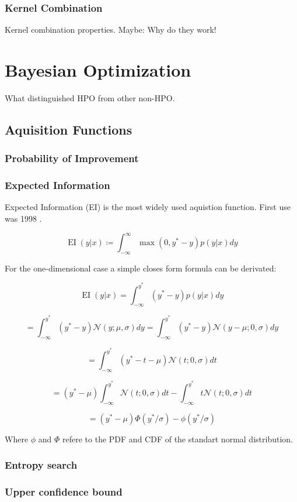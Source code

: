 \documentclass[english]{article}
\newcommand{\EI}{\operatorname{EI}}
\newcommand{\normal}{\mathcal{N}}
\begin{document}
\subsubsection{Kernel Combination}
Kernel combination properties. Maybe: Why do they work!

\section{Bayesian Optimization}
What distinguished \ac{HPO} from other non-\ac{HPO}.

\subsection{Aquisition Functions}

\subsubsection{Probability of Improvement}
\subsubsection{Expected Information}

Expected Information (EI) is the most widely used aquistion function. First use was 1998 \cite{jones_efficient_1998}.

$$ \EI(y|x) \coloneqq \int_{-\infty}^{\infty} \max(0, y^*-y)p(y|x)dy $$

For the one-dimensional case a simple closes form formula can be derivated:

$$ \EI(y|x) = \int_{-\infty}^{y^*}(y^*-y)p(y|x)dy$$

$$ = \int_{-\infty}^{y^*}(y^*-y)\normal(y; \mu, \sigma)dy =
\int_{-\infty}^{y^*}(y^*-y)\normal(y-\mu; 0, \sigma)dy$$

$$ = \int_{-\infty}^{y^*}(y^*- t - \mu)\normal(t; 0, \sigma)dt $$

$$ = (y^*-\mu)\int_{-\infty}^{y^*}\normal(t; 0, \sigma)dt - \int_{-\infty}^{y^*}t\normal(t; 0, \sigma)dt$$

$$ = (y^*-\mu)\Phi(y^*/\sigma) - \phi(y^*/\sigma) $$

Where $\phi$ and $\Phi$ refere to the PDF and CDF of the standart normal distribution.

\subsubsection{Entropy search}
\subsubsection{Upper confidence bound}
\end{document}
